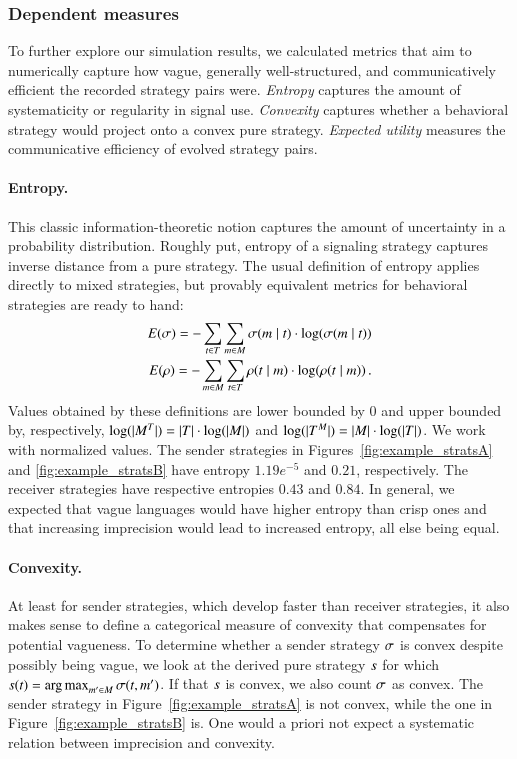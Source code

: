 \documentclass[fleqn,reqno,10pt]{article}
\begin{document}
\subsubsection{Dependent measures}
 
To further explore our simulation results, we calculated metrics that
aim to numerically capture how vague, generally well-structured, and
communicatively efficient the recorded strategy pairs
were. \emph{Entropy} captures the amount of systematicity or
regularity in signal use. \emph{Convexity} captures whether a
behavioral strategy would project onto a convex pure
strategy. \emph{Expected utility} measures the communicative
efficiency of evolved strategy pairs.

\paragraph{Entropy.} This classic information-theoretic notion
captures the amount of uncertainty in a probability
distribution. Roughly put, entropy of a signaling strategy captures
inverse distance from a pure strategy. The usual definition of entropy
applies directly to mixed strategies, but provably equivalent metrics
for behavioral strategies are ready to hand:
\begin{align*}
  E(\sigma) = -\sum_{t \in T} \sum_{m \in M}
  \sigma(m \mid t) \cdot \log(\sigma(m \mid
  t)) \\
  E(\rho) = -\sum_{m \in M} \sum_{t \in T}
  \rho(t \mid m) \cdot \log(\rho(t \mid
  m)) \,. 
\end{align*}
Values obtained by these definitions are lower bounded by $0$ and
upper bounded by, respectively, $\log(|M^T|) = |T|
\cdot \log(|M|)$ and $\log(|T^M|) = |M| \cdot
\log(|T|)$. We work with normalized values. The sender
strategies in Figures~\ref{fig:example_stratsA} and
\ref{fig:example_stratsB} have entropy $1.19e^{-5}$ and $0.21$,
respectively. The receiver strategies have respective entropies $0.43$
and $0.84$. In general, we expected that vague languages would have
higher entropy than crisp ones and that increasing imprecision would
lead to increased entropy, all else being equal.

\paragraph{Convexity.} At least for sender strategies, which develop
faster than receiver strategies, it also makes sense to define a
categorical measure of convexity that compensates for potential
vagueness. To determine whether a sender strategy $\sigma$ is convex
despite possibly being vague, we look at the derived pure strategy
$s$ for which $s(t) = \operatorname*{arg\,max}_{m' \in M}
\sigma(t,m')$. If that $s$ is convex, we also count
$\sigma$ as convex. The sender strategy in
Figure~\ref{fig:example_stratsA} is not convex, while the one in
Figure~\ref{fig:example_stratsB} is.  One would a priori not expect a
systematic relation between imprecision and convexity.
\end{document}
